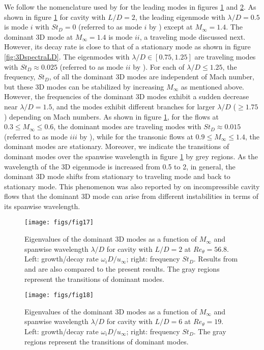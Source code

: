 \documentclass{jfm}
\begin{document}
We follow the nomenclature used by \cite{Bres:JFM08} for the leading modes in figures \ref{fig:dominant_LD2} and \ref{fig:dominant_LD6}. As shown in figure \ref{fig:dominant_LD2} for cavity with $L/D=2$, the leading eigenmode with $\lambda/D=0.5$ is mode $i$ with $St_D=0$ (referred to as mode $i$ by \cite{Bres:JFM08}) except at $M_\infty=1.4$. The dominant 3D mode at $M_\infty=1.4$ is mode $ii$, a traveling mode discussed next. However, its decay rate is close to that of a stationary mode as shown in figure \ref{fig:3DspectraLD}. The eigenmodes with $\lambda/D\in[0.75,1.25]$ are traveling modes with $St_D\approx0.025$ (referred to as mode $ii$ by \cite{Bres:JFM08}). For each of $\lambda/D\le1.25$, the frequency, $St_D$, of all the dominant 3D modes are independent of Mach number, but these 3D modes can be stabilized by increasing $M_\infty$ as mentioned above. However, the frequencies of the dominant 3D modes exhibit a sudden decrease near $\lambda/D=1.5$, and the modes exhibit different branches for larger $\lambda/D$ ($\ge1.75$) depending on Mach numbers. As shown in figure \ref{fig:dominant_LD2}, for the flows at $0.3\le M_\infty\le0.6$, the dominant modes are traveling modes with $St_D\approx0.015$ (referred to as mode $iii$ by \cite{Bres:JFM08}), while for the transonic flows at $0.9\le M_\infty \le1.4$, the dominant modes are stationary. Moreover, we indicate the transitions of dominant modes over the spanwise wavelength in figure \ref{fig:dominant_LD2} by grey regions. As the wavelength of the 3D eigenmode is increased from 0.5 to 2, in general, the dominant 3D mode shifts from stationary to traveling mode and back to stationary mode. This phenomenon was also reported by \cite{Vicente:JFM14} on incompressible cavity flows that the dominant 3D mode can arise from different instabilities in terms of its spanwise wavelength. 
\begin{figure}
\begin{center}
\texttt{[image: figs/fig17]}
   \caption{Eigenvalues of the dominant 3D modes as a function of $M_\infty$ and spanwise wavelength $\lambda/D$ for cavity with $L/D=2$ at $Re_\theta=56.8$. Left: growth/decay rate $\omega_i D/u_\infty$; right: frequency $St_D$. Results from \cite{Bres:JFM08} and \cite{Vicente:JFM14} are also compared to the present results. The gray regions represent the transitions of dominant modes.} 
      \label{fig:dominant_LD2} 
\end{center}
\end{figure}

\begin{figure}
\begin{center}
   \texttt{[image: figs/fig18]}
   \caption{Eigenvalues of the dominant 3D modes as a function of $M_\infty$ and spanwise wavelength $\lambda/D$ for cavity with $L/D=6$ at $Re_\theta=19$. Left: growth/decay rate $\omega_i D/u_\infty$; right: frequency $St_D$. The gray regions represent the transitions of dominant modes.} 
      \label{fig:dominant_LD6} 
\end{center}
\end{figure}
\end{document}
